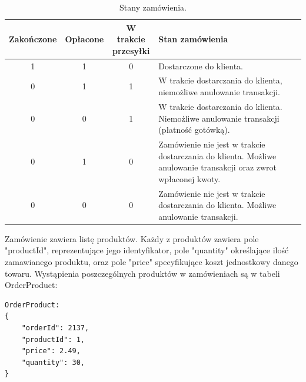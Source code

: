 \documentclass[11pt,a4paper,twoside]{article}
\begin{document}
\begin{table}[htp]
\caption{Stany zamówienia.}
\label{stanyZamowienia}
\centering
\begin{tabularx}{\textwidth}{|c|c|c|X|}
\hline
 Zakończone & Opłacone & \makecell{W trakcie \\ przesyłki} & Stan zamówienia \\\hline
 1 & 1 & 0 & Dostarczone do klienta. \\\hline
 0 & 1 & 1 & W trakcie dostarczania do klienta, niemożliwe anulowanie transakcji. \\\hline
 0 & 0 & 1 & W trakcie dostarczania do klienta. Niemożliwe anulowanie transakcji (płatność gotówką). \\\hline
 0 & 1 & 0 & Zamówienie nie jest w trakcie dostarczania do klienta. Możliwe anulowanie transakcji oraz zwrot wpłaconej kwoty. \\\hline
 0 & 0 & 0 & Zamówienie nie jest w trakcie dostarczania do klienta. Możliwe anulowanie transakcji. \\\hline
\end{tabularx}
\end{table}

Zamówienie zawiera listę produktów. Każdy z produktów zawiera pole "productId", reprezentujące jego identyfikator, pole "quantity" określające ilość zamawianego produktu, oraz pole "price" specyfikujące koszt jednostkowy danego towaru. Wystąpienia poszczególnych produktów w zamówieniach są w tabeli OrderProduct:

\begin{lstlisting}
OrderProduct:
{
	"orderId": 2137,
    "productId": 1,
    "price": 2.49,
    "quantity": 30,
}
\end{lstlisting}
\vspace{-20pt}
\end{document}
